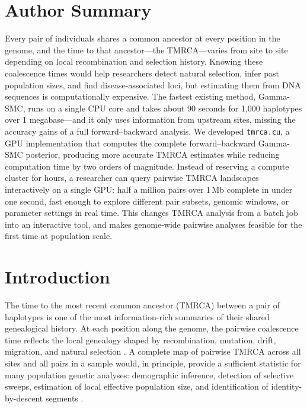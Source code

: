\documentclass[10pt,letterpaper]{article}
\begin{document}
\section*{Author Summary}
Every pair of individuals shares a common ancestor at every position in the genome, and the time to that ancestor---the TMRCA---varies from site to site depending on local recombination and selection history.
Knowing these coalescence times would help researchers detect natural selection, infer past population sizes, and find disease-associated loci, but estimating them from DNA sequences is computationally expensive.
The fastest existing method, Gamma-SMC, runs on a single CPU core and takes about 90 seconds for 1{,}000 haplotypes over 1 megabase---and it only uses information from upstream sites, missing the accuracy gains of a full forward--backward analysis.
We developed \texttt{tmrca.cu}, a GPU implementation that computes the complete forward--backward Gamma-SMC posterior, producing more accurate TMRCA estimates while reducing computation time by two orders of magnitude.
Instead of reserving a compute cluster for hours, a researcher can query pairwise TMRCA landscapes interactively on a single GPU: half a million pairs over 1\,Mb complete in under one second, fast enough to explore different pair subsets, genomic windows, or parameter settings in real time.
This changes TMRCA analysis from a batch job into an interactive tool, and makes genome-wide pairwise analyses feasible for the first time at population scale.

\section*{Introduction}

The time to the most recent common ancestor (TMRCA) between a pair of haplotypes is one of the most information-rich summaries of their shared genealogical history.
At each position along the genome, the pairwise coalescence time reflects the local genealogy shaped by recombination, mutation, drift, migration, and natural selection \cite{Li2011,Schiffels2014}.
A complete map of pairwise TMRCA across all sites and all pairs in a sample would, in principle, provide a sufficient statistic for many population genetic analyses: demographic inference, detection of selective sweeps, estimation of local effective population size, and identification of identity-by-descent segments \cite{Palamara2012,Ralph2013,Kelleher2019}.
\end{document}
